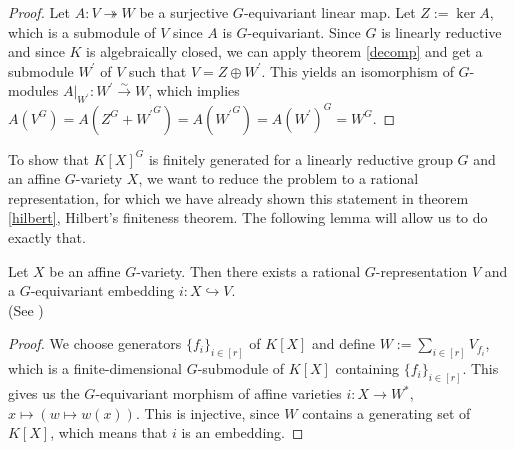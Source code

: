 \begin{proof}
  Let $A \colon V \twoheadrightarrow W$ be a surjective $G$-equivariant linear map.
  Let $Z := \operatorname{ker}A$, which is a submodule of $V$ since $A$ is $G$-equivariant.
  Since $G$ is linearly reductive and since $K$ is algebraically closed, we can apply theorem \ref{decomp} and get a submodule $W^\prime$ of $V$ such that $V = Z \oplus W^\prime$.
  This yields an isomorphism of $G$-modules $\left. A \right|_{W^\prime} \colon W^\prime \xrightarrow{\sim} W$, which implies $A(V^G) = A(Z^G + {W^\prime}^G) = A({W^\prime}^G) = A(W^\prime)^G = W^G$.
\end{proof}

To show that $K[X]^G$ is finitely generated for a linearly reductive group $G$ and an affine $G$-variety $X$, we want to reduce the problem to a rational representation, for which we have already shown this statement in theorem \ref{hilbert}, Hilbert's finiteness theorem.
The following lemma will allow us to do exactly that.

\begin{lemma}\label{emb}
  Let $X$ be an affine $G$-variety.
  Then there exists a rational \linebreak$G$-representation $V$ and a $G$-equivariant embedding $i \colon X \hookrightarrow V$.  \\
  (See \cite[A1.9]{DK15})
\end{lemma}



\begin{proof}
  We choose generators $\{f_i\}_{i \in [r]}$ of $K[X]$ and define $W := \sum_{i \in [r]} V_{f_i}$, which is a finite-dimensional $G$-submodule of $K[X]$ containing $\{f_i\}_{i \in [r]}$. %
  This gives us the $G$-equivariant morphism of affine varieties $i \colon X \rightarrow W^\ast$, \linebreak$x \mapsto (w \mapsto w(x))$.
  This is injective, since $W$ contains a generating set of $K[X]$, which means that $i$ is an embedding.
\end{proof}

